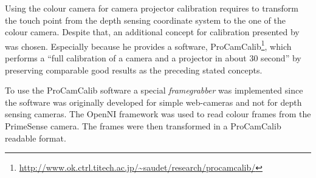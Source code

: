 Using the colour camera for camera projector calibration requires to transform the touch point from the depth sensing coordinate system to the one of the colour camera. Despite that, an additional concept for calibration presented by~\textcite{Audet:2009ee} was chosen. Especially because he provides a software, ProCamCalib\footnote{\url{http://www.ok.ctrl.titech.ac.jp/~saudet/research/procamcalib/}}, which performs a ``full calibration of a camera and a projector in about 30 second'' by preserving comparable good results as the preceding stated concepts. 

To use the ProCamCalib software a special \textit{framegrabber} was implemented since the software was originally developed for simple web-cameras and not for depth sensing cameras. The OpenNI framework was used to read colour frames from the PrimeSense camera. The frames were then transformed in a ProCamCalib readable format.

